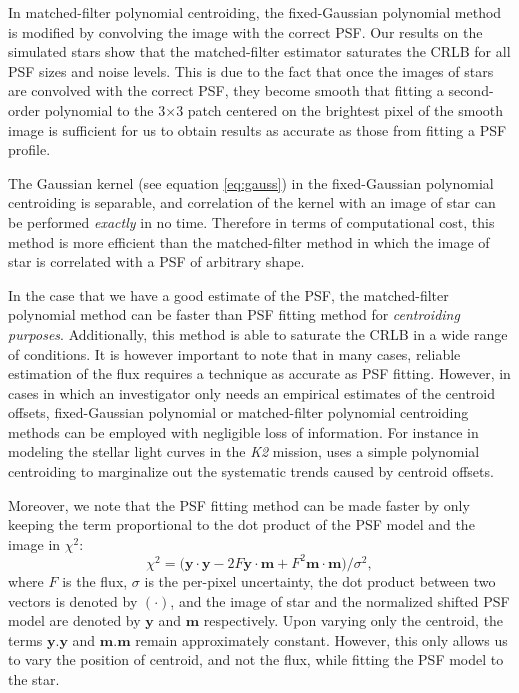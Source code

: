 \documentclass[onecolumn]{aastex61}
\newcommand{\beq}{\begin{equation}}
\newcommand{\eeq}{\end{equation}}
\newcommand{\todo}[1]{{\textcolor{dred}{ #1}}}
\begin{document}
\todo{In matched-filter polynomial centroiding, the fixed-Gaussian polynomial method is modified by convolving the image with the correct PSF. Our results on the simulated stars show that the matched-filter estimator saturates the CRLB for all PSF sizes and noise levels.  
This is due to the fact that once the images of stars are convolved with the correct PSF, they become smooth that fitting a second-order polynomial to the 3$\times$3 patch centered on the brightest pixel of the smooth image is sufficient for us to obtain results as accurate as those from fitting a PSF profile.}

\todo{The Gaussian kernel (see equation \ref{eq:gauss}) in the fixed-Gaussian polynomial centroiding is separable, and correlation of the kernel with an image of star can be performed \emph{exactly} in no time. Therefore in terms of computational cost, this method is more efficient than the matched-filter method in which the image of star is correlated with a PSF of arbitrary shape.}

\todo{In the case that we have a good estimate of the PSF, the matched-filter polynomial method can be faster than PSF fitting method for \emph{centroiding} \emph{purposes}. Additionally, this method is able to saturate the CRLB in a wide range of conditions. It is however important to note that in many cases, reliable estimation of the flux requires a technique as accurate as PSF fitting. However, in cases in which an investigator only needs an empirical estimates of the centroid offsets, fixed-Gaussian polynomial or matched-filter polynomial centroiding methods can be employed with negligible loss of information. For instance in modeling the stellar light curves in the \emph{K2} mission, \citet{dfm} uses a simple polynomial centroiding to marginalize out the systematic trends caused by centroid offsets.}


\todo{Moreover, we note that the PSF fitting method can be made faster by only keeping the term proportional to the dot product of the PSF model and the image in $\chi^2$:
\beq
\chi^{2} = \big(\mathbf{y} \cdot \mathbf{y} -2F\mathbf{y} \cdot \mathbf{m} + F^{2}\mathbf{m} \cdot \mathbf{m}\big)/\sigma^{2},
\eeq
where $F$ is the flux, $\sigma$ is the per-pixel uncertainty, the dot product between two vectors is denoted by $(\cdot)$, and the image of star and the normalized shifted PSF model are denoted by $\mathbf{y}$ and $\mathbf{m}$ respectively. Upon varying only the centroid, the terms $\mathbf{y}.\mathbf{y}$ and $\mathbf{m}.\mathbf{m}$ remain approximately constant. However, this only allows us to vary the position of centroid, and not the flux, while fitting the PSF model to the star.}
\end{document}
